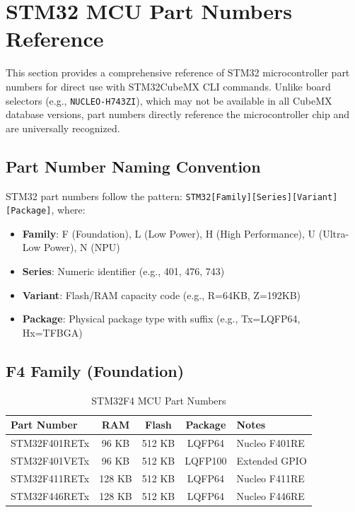 \section{STM32 MCU Part Numbers Reference}
\label{app:mcu_part_numbers}

This section provides a comprehensive reference of STM32 microcontroller part numbers for direct use with STM32CubeMX CLI commands. Unlike board selectors (e.g., \texttt{NUCLEO-H743ZI}), which may not be available in all CubeMX database versions, part numbers directly reference the microcontroller chip and are universally recognized.

\subsection{Part Number Naming Convention}

STM32 part numbers follow the pattern: \texttt{STM32[Family][Series][Variant][Package]}, where:
\begin{itemize}
    \item \textbf{Family}: F (Foundation), L (Low Power), H (High Performance), U (Ultra-Low Power), N (NPU)
    \item \textbf{Series}: Numeric identifier (e.g., 401, 476, 743)
    \item \textbf{Variant}: Flash/RAM capacity code (e.g., R=64KB, Z=192KB)
    \item \textbf{Package}: Physical package type with suffix (e.g., Tx=LQFP64, Hx=TFBGA)
\end{itemize}

\subsection{F4 Family (Foundation)}

\begin{table}[H]
    \centering
    \caption{STM32F4 MCU Part Numbers}
    \label{tab:f4_parts}
    \small
    \begin{tabular}{|l|c|c|c|l|}
        \hline
        \textbf{Part Number} & \textbf{RAM} & \textbf{Flash} & \textbf{Package} & \textbf{Notes} \\
        \hline
        STM32F401RETx        & 96 KB        & 512 KB         & LQFP64           & Nucleo F401RE  \\
        STM32F401VETx        & 96 KB        & 512 KB         & LQFP100          & Extended GPIO  \\
        STM32F411RETx        & 128 KB       & 512 KB         & LQFP64           & Nucleo F411RE  \\
        STM32F446RETx        & 128 KB       & 512 KB         & LQFP64           & Nucleo F446RE  \\
        \hline
    \end{tabular}
\end{table}

